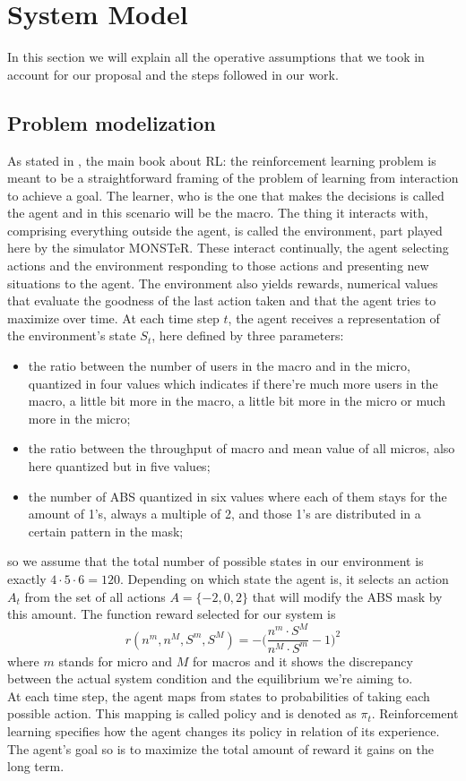 \documentclass[conference,10pt]{IEEEtran}
\begin{document}
\section{System Model}\label{sec:symo}
In this section we will explain all the operative assumptions that we took in account for our proposal and the steps followed in our work.
\subsection{Problem modelization}
As stated in \cite{sutton1998reinforcement}, the main book about RL: the reinforcement learning problem is meant to be a straightforward framing of the problem of learning from interaction to achieve a goal. The learner, who is the one that makes the decisions is called the agent and in this scenario will be the macro. The thing it interacts with, comprising everything outside the agent, is called the environment, part played here by the simulator MONSTeR. These interact continually, the agent selecting actions and the environment responding to those actions and presenting new situations to the agent. The environment also yields rewards, numerical values that evaluate the goodness of the last action taken and that the agent tries to maximize over time. At each time step $t$, the agent receives a representation of the environment's state $S_t$, here defined by three parameters:
\begin{itemize}
\item the ratio between the number of users in the macro and in the micro, quantized in four values which indicates if there're much more users in the macro, a little bit more in the macro, a little bit more in the micro or much more in the micro;
\item the ratio between the throughput of macro and mean value of all micros, also here quantized but in five values;
\item the number of ABS quantized in six values where each of them stays for the amount of 1's, always a multiple of 2, and those 1's are distributed in a certain pattern in the mask;    
\end{itemize}
so we assume that the total number of possible states in our environment is exactly $4\cdot 5\cdot 6=120$. Depending on which state the agent is, it selects an action $A_t$ from the set of all actions $A=\lbrace-2,0,2\rbrace$ that will modify the ABS mask by this amount.  The function reward selected for our system is 
\begin{equation*}
r(n^{m},n^{M},S^{m},S^{M})=-\bigg( \frac{n^{m}\cdot S^{M}}{n^{M} \cdot S^{m}}-1 \bigg) ^2
\end{equation*} 
where $m$ stands for micro and $M$ for macros and it shows the discrepancy between the actual system condition and the equilibrium we're aiming to. \\
At each time step, the agent maps from states to probabilities of taking each possible action. This mapping is called policy and is denoted as $\pi_t$. Reinforcement
learning specifies how the agent changes its policy in relation of its experience. The agent’s goal so is to maximize the total amount of reward it gains on the long term.
\end{document}
